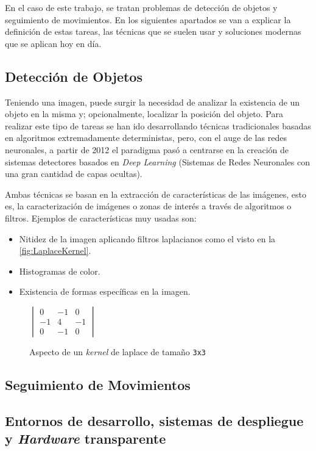 En el caso de este trabajo, se tratan problemas de detección de objetos y seguimiento de movimientos. En los siguientes apartados se van a explicar la definición de estas tareas, las técnicas que se 
suelen usar y soluciones modernas que se aplican hoy en día.

\subsection{Detección de Objetos}

Teniendo una imagen, puede surgir la necesidad de analizar la existencia de un objeto en la misma y; opcionalmente, localizar la posición del objeto. Para realizar este tipo de tareas se han ido 
desarrollando técnicas tradicionales basadas en algoritmos extremadamente deterministas, pero, con el auge de las redes neuronales, a partir de 2012\cite{zouObjectDetection202023} 
el paradigma pasó a centrarse en la creación de sistemas detectores basados en \textit{Deep Learning} (Sistemas de Redes Neuronales con una gran cantidad de capas ocultas).

Ambas técnicas se basan en la extracción de características de las imágenes, esto es, la caracterización de imágenes o zonas de interés a través de algoritmos o filtros. Ejemplos de características 
muy usadas son:
\begin{itemize}
    \item Nitidez de la imagen aplicando filtros laplacianos como el visto en la \autoref{fig:LaplaceKernel}.
    \item Histogramas de color.
    \item Existencia de formas específicas en la imagen.
\end{itemize}

\begin{figure}[H]
    \centering
    \(
    \begin{vmatrix}
        0 & -1 & 0 \\
        -1 & 4 & -1 \\
        0 & -1 & 0
    \end{vmatrix}
    \)
    \caption{Aspecto de un \textit{kernel} de laplace de tamaño \texttt{3x3}}
    \label{fig:LaplaceKernel}
\end{figure}


\subsection{Seguimiento de Movimientos}

\subsection{Entornos de desarrollo, sistemas de despliegue y \textit{Hardware} transparente}